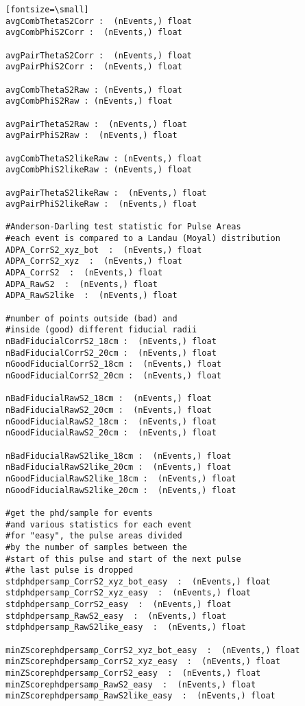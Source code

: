 \begin{verbatim}[fontsize=\small]
avgCombThetaS2Corr :  (nEvents,) float 
avgCombPhiS2Corr :  (nEvents,) float 

avgPairThetaS2Corr :  (nEvents,) float 
avgPairPhiS2Corr :  (nEvents,) float 

avgCombThetaS2Raw : (nEvents,) float
avgCombPhiS2Raw : (nEvents,) float

avgPairThetaS2Raw :  (nEvents,) float
avgPairPhiS2Raw :  (nEvents,) float

avgCombThetaS2likeRaw : (nEvents,) float
avgCombPhiS2likeRaw : (nEvents,) float

avgPairThetaS2likeRaw :  (nEvents,) float
avgPairPhiS2likeRaw :  (nEvents,) float

#Anderson-Darling test statistic for Pulse Areas
#each event is compared to a Landau (Moyal) distribution
ADPA_CorrS2_xyz_bot  :  (nEvents,) float
ADPA_CorrS2_xyz  :  (nEvents,) float
ADPA_CorrS2  :  (nEvents,) float
ADPA_RawS2  :  (nEvents,) float
ADPA_RawS2like  :  (nEvents,) float

#number of points outside (bad) and 
#inside (good) different fiducial radii
nBadFiducialCorrS2_18cm :  (nEvents,) float
nBadFiducialCorrS2_20cm :  (nEvents,) float
nGoodFiducialCorrS2_18cm :  (nEvents,) float
nGoodFiducialCorrS2_20cm :  (nEvents,) float

nBadFiducialRawS2_18cm :  (nEvents,) float
nBadFiducialRawS2_20cm :  (nEvents,) float
nGoodFiducialRawS2_18cm :  (nEvents,) float
nGoodFiducialRawS2_20cm :  (nEvents,) float

nBadFiducialRawS2like_18cm :  (nEvents,) float
nBadFiducialRawS2like_20cm :  (nEvents,) float
nGoodFiducialRawS2like_18cm :  (nEvents,) float
nGoodFiducialRawS2like_20cm :  (nEvents,) float

#get the phd/sample for events 
#and various statistics for each event
#for "easy", the pulse areas divided 
#by the number of samples between the 
#start of this pulse and start of the next pulse
#the last pulse is dropped
stdphdpersamp_CorrS2_xyz_bot_easy  :  (nEvents,) float
stdphdpersamp_CorrS2_xyz_easy  :  (nEvents,) float
stdphdpersamp_CorrS2_easy  :  (nEvents,) float
stdphdpersamp_RawS2_easy  :  (nEvents,) float
stdphdpersamp_RawS2like_easy  :  (nEvents,) float

minZScorephdpersamp_CorrS2_xyz_bot_easy  :  (nEvents,) float
minZScorephdpersamp_CorrS2_xyz_easy  :  (nEvents,) float
minZScorephdpersamp_CorrS2_easy  :  (nEvents,) float
minZScorephdpersamp_RawS2_easy  :  (nEvents,) float
minZScorephdpersamp_RawS2like_easy  :  (nEvents,) float


\end{verbatim}
